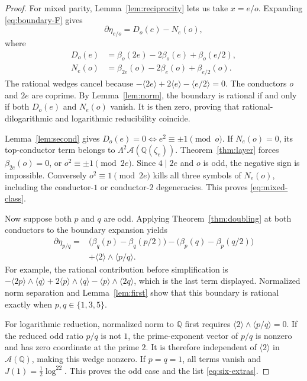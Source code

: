 \documentclass[11pt]{article}
\numberwithin{equation}{section}
\theoremstyle{definition}
\theoremstyle{remark}
\newcommand{\Q}{\mathbb Q}
\newcommand{\A}{\mathcal A}
\newcommand{\cl}[1]{\langle #1\rangle}
\begin{document}
\begin{proof}
For mixed parity, Lemma~\ref{lem:reciprocity} lets us take $x=e/o$.
Expanding \eqref{eq:boundary-F} gives
\begin{equation}\label{eq:mixed-boundary}
 \partial\eta_{e/o}=D_o(e)-N_e(o),
\end{equation}
where
\begin{align}
 D_o(e)&=\beta_o(2e)-2\beta_o(e)+\beta_o(e/2),\label{eq:D}\\
 N_e(o)&=\beta_{2e}(o)-2\beta_e(o)+\beta_{e/2}(o).\label{eq:N}
\end{align}
The rational wedges cancel because
$-\cl{2e}+2\cl e-\cl{e/2}=0$. The conductors $o$ and $2e$ are
coprime. By Lemma~\ref{lem:norm}, the boundary is rational if and only
if both $D_o(e)$ and $N_e(o)$ vanish. It is then zero, proving that
rational-dilogarithmic and logarithmic reducibility coincide.

Lemma~\ref{lem:second} gives
$D_o(e)=0\Longleftrightarrow e^2\equiv\pm1\pmod o$.
If $N_e(o)=0$, its top-conductor term belongs to
$\Lambda^2\A(\Q(\zeta_e))$. Theorem~\ref{thm:layer} forces
$\beta_{2e}(o)=0$, or $o^2\equiv\pm1\pmod{2e}$.
Since $4\mid2e$ and $o$ is odd, the negative sign is impossible.
Conversely $o^2\equiv1\pmod{2e}$ kills all three symbols of
$N_e(o)$, including the conductor-$1$ or conductor-$2$ degeneracies.
This proves \eqref{eq:mixed-class}.

Now suppose both $p$ and $q$ are odd. Applying
Theorem~\ref{thm:doubling} at both conductors to the boundary expansion
yields
\begin{equation}\label{eq:odd-boundary}
 \begin{split}
 \partial\eta_{p/q}={}&
  \bigl(\beta_q(p)-\beta_q(p/2)\bigr)
 -\bigl(\beta_p(q)-\beta_p(q/2)\bigr)\\
 &+\cl2\wedge\cl{p/q}.
 \end{split}
\end{equation}
For example, the rational contribution before simplification is
$-\cl{2p}\wedge\cl q+2\cl p\wedge\cl q
 -\cl p\wedge\cl{2q}$, which is the last term displayed.
Normalized norm separation and Lemma~\ref{lem:first} show that this
boundary is rational exactly when $p,q\in\{1,3,5\}$.

For logarithmic reduction, normalized norm to $\Q$ first requires
$\cl2\wedge\cl{p/q}=0$. If the reduced odd ratio $p/q$ is not $1$,
the prime-exponent vector of $p/q$ is nonzero and has zero coordinate
at the prime $2$. It is therefore independent of $\cl2$ in
$\A(\Q)$, making this wedge nonzero. If $p=q=1$, all terms vanish
and $J(1)=\tfrac12\log^22$. This proves the odd case and the list
\eqref{eq:six-extras}.
\end{proof}
\end{document}
